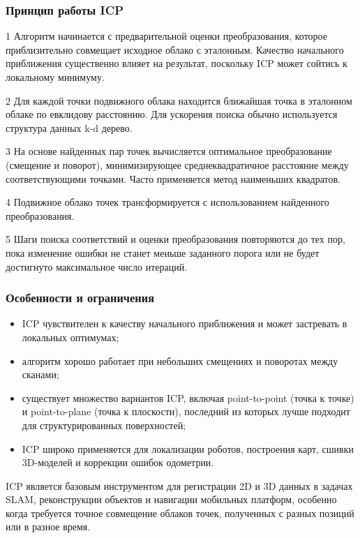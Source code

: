 \subsubsection{Принцип работы ICP}

1 Алгоритм начинается с предварительной оценки преобразования, которое
приблизительно совмещает исходное облако с эталонным. Качество начального
приближения существенно влияет на результат, поскольку ICP может сойтись к
локальному минимуму.
    
2 Для каждой точки подвижного облака находится ближайшая точка в эталонном
облаке по евклидову расстоянию. Для ускорения поиска обычно используется
структура данных k-d дерево.
    
3 На основе найденных пар точек вычисляется оптимальное преобразование (смещение
и поворот), минимизирующее среднеквадратичное расстояние между соответствующими
точками. Часто применяется метод наименьших квадратов.
    
4 Подвижное облако точек трансформируется с использованием найденного
преобразования.
    
5 Шаги поиска соответствий и оценки преобразования повторяются до тех пор, пока
изменение ошибки не станет меньше заданного порога или не будет достигнуто
максимальное число итераций.

\subsubsection{Особенности и ограничения}
\begin{itemize}
	\item ICP чувствителен к качеству начального приближения и может застревать в локальных оптимумах;
	\item алгоритм хорошо работает при небольших смещениях и поворотах между сканами;
	\item существует множество вариантов ICP, включая point-to-point (точка к точке) и point-to-plane (точка к плоскости), последний из которых лучше подходит для структурированных поверхностей;
	\item ICP широко применяется для локализации роботов, построения карт, сшивки 3D-моделей и коррекции ошибок одометрии.
\end{itemize}

ICP является базовым инструментом для регистрации 2D и 3D данных в задачах SLAM, реконструкции объектов и навигации мобильных платформ, особенно когда требуется точное совмещение облаков точек, полученных с разных позиций или в разное время.

